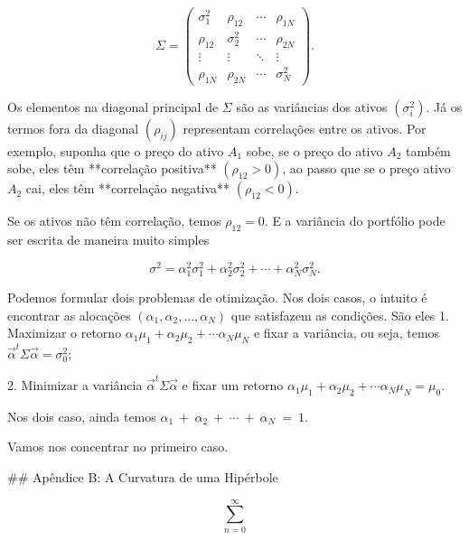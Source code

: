 \documentclass{article}
\begin{document}
$$ \Sigma = \begin{pmatrix}\sigma_1^2 & \rho_{12} & \cdots & \rho_{1N} \\ \rho_{12} & \sigma_2^2 & \cdots & \rho_{2N} \\ \vdots & \vdots & \ddots & \vdots \\ \rho_{1N} & \rho_{2N} & \cdots & \sigma_N^2  \end{pmatrix}. $$

Os elementos na diagonal principal de $\Sigma$ são as variâncias dos ativos $(\sigma_i^2)$. Já os termos fora da diagonal $(\rho_{ij})$ representam correlações entre os ativos. Por exemplo, suponha que o preço do ativo $A_1$ sobe, se o preço do ativo $A_2$ também sobe, eles têm **correlação positiva** $(\rho_{12}>0)$, ao passo que se o preço ativo $A_2$ cai, eles têm **correlação negativa** $(\rho_{12}<0)$. 

Se os ativos não têm correlação, temos $\rho_{12} = 0$. E a variância do portfólio pode ser escrita de maneira muito simples

$$ \sigma^2 = \alpha_1^2\sigma_1^2 + \alpha_2^2\sigma_2^2 + \cdots + \alpha_N^2\sigma_N^2.$$

Podemos formular dois problemas de otimização. Nos dois casos, o intuito é encontrar as alocações $(\alpha_1, \alpha_2, ..., \alpha_N)$ que satisfazem as condições. São eles
1. Maximizar o retorno $ \alpha_1\mu_1 + \alpha_2\mu_2 + \cdots \alpha_N\mu_N $ e fixar a variância, ou seja, temos $\vec{\alpha}^t \Sigma \vec{\alpha} = \sigma_0^2 $;

2. Minimizar a variância $ \vec{\alpha}^t \Sigma \vec{\alpha} $ e fixar um retorno $ \alpha_1\mu_1 + \alpha_2\mu_2 + \cdots \alpha_N\mu_N = \mu_0 $.

Nos dois caso, ainda temos $\alpha_1~+~\alpha_2~+~\cdots~+~\alpha_N~=~1$.

Vamos nos concentrar no primeiro caso.


## Apêndice B: A Curvatura de uma Hipérbole

$$\sum_{n = 0}^\infty $$
\end{document}
